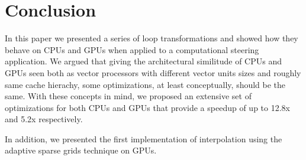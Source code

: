 \section{Conclusion}

In this paper we presented a series of loop transformations and showed
how they behave on CPUs and GPUs when applied to a computational steering
application. We argued that giving the architectural similitude of CPUs and GPUs
seen both as vector processors with different vector units sizes and roughly
same cache hierachy, some optimizations, at least conceptually, should be the
same. With these concepts in mind, we proposed an extensive set of optimizations
for both CPUs and GPUs that provide a speedup of up to 12.8x and 5.2x
respectively.

In addition, we presented the first implementation of interpolation
using the adaptive sparse grids technique on GPUs.


